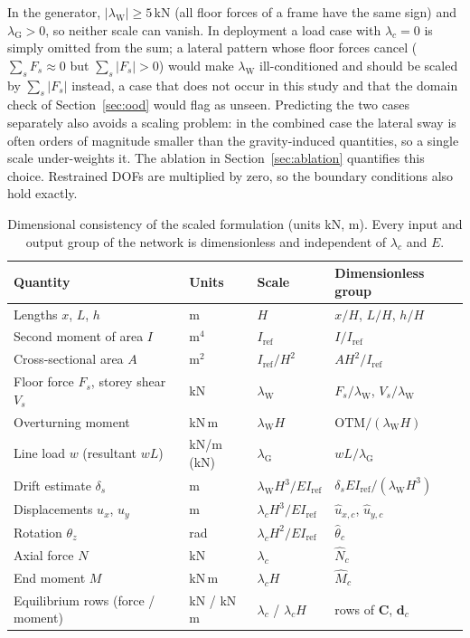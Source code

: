 In the generator, $|\lambda_\mathrm{W}|\ge 5$\,kN (all floor forces of a frame have the same sign) and $\lambda_\mathrm{G}>0$, so neither scale can vanish. In deployment a load case with $\lambda_c=0$ is simply omitted from the sum; a lateral pattern whose floor forces cancel ($\sum_sF_s\approx0$ but $\sum_s|F_s|>0$) would make $\lambda_\mathrm{W}$ ill-conditioned and should be scaled by $\sum_s|F_s|$ instead, a case that does not occur in this study and that the domain check of Section~\ref{sec:ood} would flag as unseen. Predicting the two cases separately also avoids a scaling problem: in the combined case the lateral sway is often orders of magnitude smaller than the gravity-induced quantities, so a single scale under-weights it. The ablation in Section~\ref{sec:ablation} quantifies this choice. Restrained DOFs are multiplied by zero, so the boundary conditions also hold exactly.

\begin{table}[t]
\centering
\caption{Dimensional consistency of the scaled formulation (units kN, m). Every input and output group of the network is dimensionless and independent of $\lambda_c$ and $E$.}\label{tab:dimensions}
\footnotesize
\begin{tabular}{llll}
\toprule
Quantity & Units & Scale & Dimensionless group \\
\midrule
Lengths $x$, $L$, $h$ & m & $H$ & $x/H$, $L/H$, $h/H$ \\
Second moment of area $I$ & m$^4$ & $I_\mathrm{ref}$ & $I/I_\mathrm{ref}$ \\
Cross-sectional area $A$ & m$^2$ & $I_\mathrm{ref}/H^2$ & $AH^2/I_\mathrm{ref}$ \\
Floor force $F_s$, storey shear $V_s$ & kN & $\lambda_\mathrm{W}$ & $F_s/\lambda_\mathrm{W}$, $V_s/\lambda_\mathrm{W}$ \\
Overturning moment & kN\,m & $\lambda_\mathrm{W}H$ & $\mathrm{OTM}/(\lambda_\mathrm{W}H)$ \\
Line load $w$ (resultant $wL$) & kN/m (kN) & $\lambda_\mathrm{G}$ & $wL/\lambda_\mathrm{G}$ \\
Drift estimate $\delta_s$ & m & $\lambda_\mathrm{W}H^3/EI_\mathrm{ref}$ & $\delta_s EI_\mathrm{ref}/(\lambda_\mathrm{W}H^3)$ \\
Displacements $u_x$, $u_y$ & m & $\lambda_cH^3/EI_\mathrm{ref}$ & $\hat u_{x,c}$, $\hat u_{y,c}$ \\
Rotation $\theta_z$ & rad & $\lambda_cH^2/EI_\mathrm{ref}$ & $\hat\theta_c$ \\
Axial force $N$ & kN & $\lambda_c$ & $\hat N_c$ \\
End moment $M$ & kN\,m & $\lambda_cH$ & $\hat M_c$ \\
Equilibrium rows (force / moment) & kN / kN\,m & $\lambda_c$ / $\lambda_cH$ & rows of $\mathbf{C}$, $\mathbf{d}_c$ \\
\bottomrule
\end{tabular}
\end{table}

